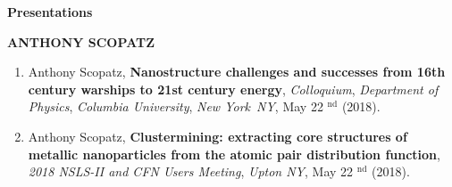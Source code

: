\documentclass[prl,tighten,amsmath,amssymb,floatfix]{revtex4-1}
\begin{document}
\textbf{Presentations}

\textbf{ANTHONY SCOPATZ}
\vskip 12pt

\begin{enumerate}

\item Anthony Scopatz, {\bf Nanostructure challenges and successes from 16th century warships to 21st century energy},
{\it Colloquium},
{\it Department of Physics},
{\it Columbia University},
{\it New York}\
{\it NY},
{ May }22%
$^\mathrm{ nd }$
(2018).

\item Anthony Scopatz, {\bf Clustermining: extracting core structures of metallic nanoparticles from the atomic pair distribution function},
{\it 2018 NSLS-II and CFN Users Meeting},
{\it Upton NY},
{ May }22%
$^\mathrm{ nd }$
(2018).

\end{enumerate}
\end{document}
